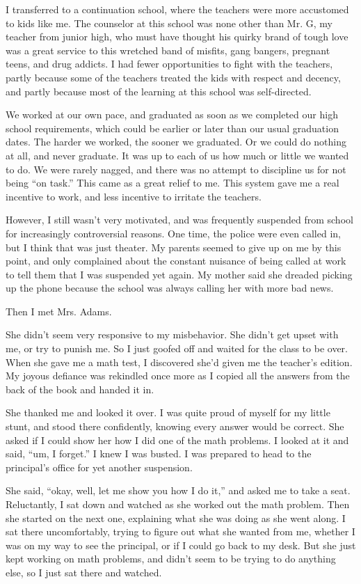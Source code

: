 I transferred to a continuation school, where the teachers were more accustomed to kids like me. The counselor at this school was none other than Mr. G, my teacher from junior high, who must have thought his quirky brand of tough love was a great service to this wretched band of misfits, gang bangers, pregnant teens, and drug addicts. I had fewer opportunities to fight with the teachers, partly because some of the teachers treated the kids with respect and decency, and partly because most of the learning at this school was self-directed.

We worked at our own pace, and graduated as soon as we completed our high school requirements, which could be earlier or later than our usual graduation dates. The harder we worked, the sooner we graduated. Or we could do nothing at all, and never graduate. It was up to each of us how much or little we wanted to do. We were rarely nagged, and there was no attempt to discipline us for not being ``on task.'' This came as a great relief to me. This system gave me a real incentive to work, and less incentive to irritate the teachers.

However, I still wasn't very motivated, and was frequently suspended from school for increasingly controversial reasons. One time, the police were even called in, but I think that was just theater. My parents seemed to give up on me by this point, and only complained about the constant nuisance of being called at work to tell them that I was suspended yet again. My mother said she dreaded picking up the phone because the school was always calling her with more bad news.

Then I met Mrs. Adams.

She didn't seem very responsive to my misbehavior. She didn't get upset with me, or try to punish me. So I just goofed off and waited for the class to be over. When she gave me a math test, I discovered she'd given me the teacher's edition. My joyous defiance was rekindled once more as I copied all the answers from the back of the book and handed it in.

She thanked me and looked it over. I was quite proud of myself for my little stunt, and stood there confidently, knowing every answer would be correct. She asked if I could show her how I did one of the math problems. I looked at it and said, ``um, I forget.'' I knew I was busted. I was prepared to head to the principal's office for yet another suspension.

She said, ``okay, well, let me show you how I do it,'' and asked me to take a seat. Reluctantly, I sat down and watched as she worked out the math problem. Then she started on the next one, explaining what she was doing as she went along. I sat there uncomfortably, trying to figure out what she wanted from me, whether I was on my way to see the principal, or if I could go back to my desk. But she just kept working on math problems, and didn't seem to be trying to do anything else, so I just sat there and watched.

